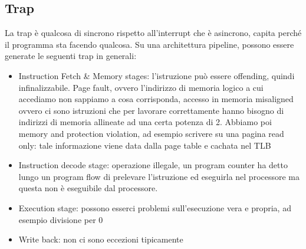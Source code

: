 \documentclass[14pt]{article}
\begin{document}
\subsection{Trap}
La trap è qualcosa di sincrono rispetto all'interrupt che è asincrono, capita perché il programma sta facendo qualcosa. Su una architettura pipeline, possono essere generate le seguenti trap in generali:
\begin{itemize}
\item Instruction Fetch \& Memory stages: l'istruzione può essere offending, quindi infinalizzabile. Page fault, ovvero l'indirizzo di memoria logico a cui accediamo non sappiamo a cosa corrisponda, accesso in memoria misaligned ovvero ci sono istruzioni che per lavorare correttamente hanno bisogno di indirizzi di memoria allineate ad una certa potenza di 2. Abbiamo poi memory and protection violation, ad esempio scrivere su una pagina read only: tale informazione viene data dalla page table e cachata nel TLB
\item Instruction decode stage: operazione illegale, un program counter ha detto lungo un program flow di prelevare l'istruzione ed eseguirla nel processore ma questa non è eseguibile dal processore. 
\item Execution stage: possono esserci problemi sull'esecuzione vera e propria, ad esempio divisione per 0
\item Write back: non ci sono eccezioni tipicamente
\end{itemize}
\end{document}
